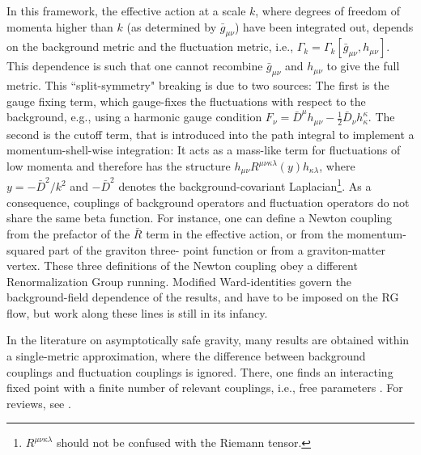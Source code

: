 \documentclass[11pt]{book} %
\begin{document}
In this framework, the effective action at a scale $k$, where degrees of freedom of momenta higher than $k$ (as determined by $\bar{g}_{\mu \nu}$) have been integrated out, depends on the background metric and the fluctuation metric, i.e., $\Gamma_k = \Gamma_k[\bar{g}_{\mu \nu}, h_{\mu \nu}]$. This dependence is such that one cannot recombine $\bar{g}_{\mu \nu}$ and $h_{\mu \nu}$ to give the full metric.
This ``split-symmetry" breaking is due to two sources:
The first is the gauge fixing term, which gauge-fixes the fluctuations with respect to the background, e.g., using a harmonic gauge condition $F_{\nu}=\bar{D}^{\mu}h_{\mu \nu} -\frac{1}{2} \bar{D}_{\nu}h^{\kappa}_{\kappa}$.
The second is the cutoff term, that is introduced into the path integral to implement a momentum-shell-wise integration: It acts as a mass-like term for fluctuations of low momenta and therefore has the structure $h_{\mu \nu} R^{\mu \nu \kappa \lambda} (y) h_{\kappa \lambda}$, where $y=-\bar{D}^2/k^2$ and $-\bar{D}^2$ denotes the background-covariant Laplacian\footnote{$R^{\mu \nu \kappa \lambda}$ should not be confused with the
Riemann tensor.}.
As a consequence, couplings of background operators and fluctuation operators do not share the same beta function. For instance, one can define a Newton coupling from the prefactor of the $\bar{R}$ term in the effective action, or from the momentum-squared part of the graviton three- point function or from a graviton-matter vertex. These three definitions of the Newton coupling obey a different Renormalization Group running. Modified Ward-identities govern the background-field dependence of the results, and have to be imposed on the RG flow, but work along these lines is still in its infancy.

In the literature on asymptotically safe gravity, many results are obtained within a single-metric approximation, where the difference between background couplings and fluctuation couplings is ignored. There, one finds an interacting fixed point with a finite number of relevant couplings, i.e., free parameters \cite{Reuter:1996cp,Dou:1997fg,Reuter:2001ag,Lauscher:2001ya,Lauscher:2002sq,Litim:2003vp,Fischer:2006fz,Machado:2007ea,Eichhorn:2009ah,
Codello:2006in,Codello:2008vh,Benedetti:2009rx,Eichhorn:2010tb, Groh:2010ta,Manrique:2011jc,Rechenberger:2012dt,Benedetti:2012dx,Dietz:2012ic,
Falls:2013bv,Benedetti:2013jk,Ohta:2013uca, Demmel:2014sga,Falls:2014tra, Falls:2015qga, Falls:2015cta,Gies:2015tca, Demmel:2015oqa}. For reviews, see \cite{ASreviews}.
\end{document}

